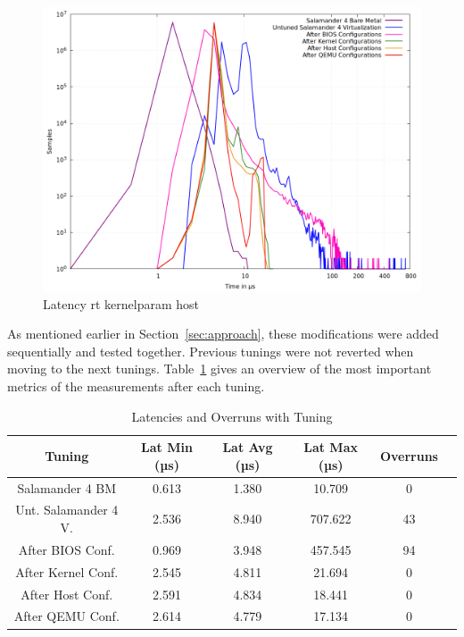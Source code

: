 \documentclass[MMR,Master,english]{twbook}
\begin{document}
\begin{figure}[H]
	\centering
	\includegraphics[width=0.70\columnwidth]{masterthesis-documentation/docs/sigmatek/xenomai/012456combined/gnuplot_combined_max_latency.png}
	\caption[Latency rt kernelparam host]{Latency rt kernelparam host}
	\label{fig:max_latency_combined_results}
\end{figure}

\noindent As mentioned earlier in Section~\ref{sec:approach}, these modifications were added sequentially and tested together. Previous tunings were not reverted when moving to the next tunings. Table~\ref{tab:latency_tables_combined} gives an overview of the most important metrics of the measurements after each tuning. 

\begin{table}[H]
	\centering
	\footnotesize
	\caption{Latencies and Overruns with Tuning}
	\label{tab:latency_tables_combined}
	\begin{tabular}{|c|c|c|c|c|c|}
		\hline
		\textbf{Tuning} & \textbf{Lat Min (µs)} & \textbf{Lat Avg (µs)} & \textbf{Lat Max (µs)} & \textbf{Overruns} \\ \hline
		Salamander 4 BM        & 0.613                 & 1.380                 & 10.709            & 0                 \\ \hline
		Unt. Salamander 4 V.        & 2.536                 & 8.940                 & 707.622      & 43                \\ \hline
		After BIOS Conf.   & 0.969                 & 3.948                 & 457.545               & 94                \\ \hline
		After Kernel Conf. & 2.545                 & 4.811                 & 21.694                & 0                 \\ \hline
		After Host Conf.   & 2.591                 & 4.834                 & 18.441                & 0                 \\ \hline
		After QEMU Conf.   & 2.614                 & 4.779                 & 17.134                & 0                 \\ \hline
	\end{tabular}
\end{table}
\end{document}
